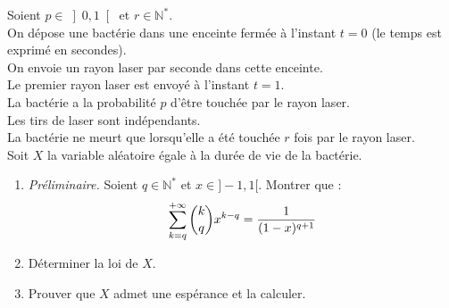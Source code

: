\documentclass[a4paper,10pt]{report}
\begin{document}
\begin{Exa} Soient $p\in \left] 0,1\right[$ et $r\in\mathbb{N}^*$.\\
On dépose une bactérie dans une enceinte fermée à l'instant $t=0$ (le temps est exprimé en secondes).\\
On envoie un rayon laser par seconde dans cette enceinte.\\
Le premier rayon laser est envoyé à l'instant $t=1$.\\
La bactérie a la probabilité $p$ d'être touchée par le rayon laser.\\
Les tirs de laser sont indépendants.\\
La bactérie ne meurt que lorsqu'elle a été touchée $r$ fois par le rayon laser.\\
Soit $X$ la variable aléatoire égale à la durée de vie de la bactérie.\\
\begin{enumerate}
\item \textit{Préliminaire.} Soient $q \in \mathbb{N}^*$ et $x \in ]-1,1[$. Montrer que : 
$$ \sum\limits_{k=q}^{+\infty}\dbinom{k}{q}x^{k-q}=\dfrac{1}{(1-x)^{q+1}}$$
\item
Déterminer la loi de $X$.
\item
Prouver que $X$ admet une espérance et la calculer.
\end{enumerate}
\end{Exa}

\corr
\end{document}
